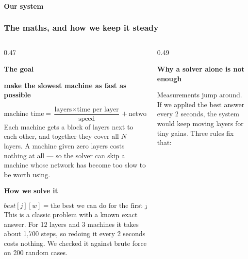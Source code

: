 \documentclass[aspectratio=169,11pt]{beamer}
\newcommand{\kecard}[3][kemist]{%
  \begin{beamercolorbox}[wd=#2,sep=6pt,rounded=true]{}%
    \colorbox{#1}{\begin{minipage}{\dimexpr#2-14pt\relax}#3\end{minipage}}%
  \end{beamercolorbox}}
\newcommand{\kesub}[1]{{\footnotesize\color{kebody}#1}}
\begin{document}
\begin{frame}[shrink=20]
  \framesubtitle{Our system}
  \frametitle{The maths, and how we keep it steady}
  \begin{columns}[T]
  \begin{column}{0.47\textwidth}\footnotesize
    \kecard{\textwidth}{%
      {\bfseries\color{keamber}The goal}\par\vspace{0.4em}
      \begin{center}\bfseries make the slowest machine as fast as possible
      \end{center}
      \vspace{-0.4em}
      \[\text{machine time}=\frac{\text{layers}\times\text{time per layer}}
                                 {\text{speed}} + \text{network delay}\]
      \vspace{-0.4em}
      \kesub{Each machine gets a block of layers next to each other, and
      together they cover all $N$ layers. A machine given zero layers costs
      nothing at all --- so the solver can skip a machine whose network has
      become too slow to be worth using.}}\vspace{0.4em}
    \kecard{\textwidth}{%
      {\bfseries\color{keteal}How we solve it}\par\vspace{0.4em}
      \[\mathit{best}[j][w]=\text{the best we can do for the first }j
        \text{ layers on }w\text{ machines}\]
      \vspace{-0.4em}
      \kesub{This is a classic problem with a known exact answer. For 12 layers
      and 3 machines it takes about 1{,}700 steps, so redoing it every 2
      seconds costs nothing. We checked it against brute force on 200 random
      cases.}}
  \end{column}
  \begin{column}{0.49\textwidth}
    \colorbox{keink}{\begin{minipage}{\dimexpr\textwidth-14pt\relax}\footnotesize
      \vspace{0.4em}
      {\bfseries\color{keamber}Why a solver alone is not enough}\par
      \vspace{0.4em}
      {\scriptsize\color{white!68!keink}Measurements jump around. If we
       applied the best answer every 2 seconds, the system would keep moving
       layers for tiny gains. Three rules fix that:}\par\vspace{0.8em}

\end{minipage}}
\end{column}
\end{columns}
\end{frame}
\end{document}
